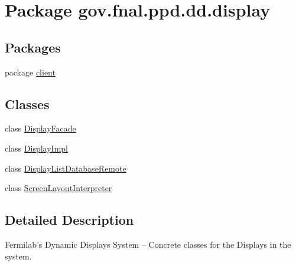 \hypertarget{namespacegov_1_1fnal_1_1ppd_1_1dd_1_1display}{\section{Package gov.\-fnal.\-ppd.\-dd.\-display}
\label{namespacegov_1_1fnal_1_1ppd_1_1dd_1_1display}
}
\subsection*{Packages}
\begin{DoxyCompactItemize}
\item 
package \hyperlink{namespacegov_1_1fnal_1_1ppd_1_1dd_1_1display_1_1client}{client}
\end{DoxyCompactItemize}
\subsection*{Classes}
\begin{DoxyCompactItemize}
\item 
class \hyperlink{classgov_1_1fnal_1_1ppd_1_1dd_1_1display_1_1DisplayFacade}{Display\-Facade}
\item 
class \hyperlink{classgov_1_1fnal_1_1ppd_1_1dd_1_1display_1_1DisplayImpl}{Display\-Impl}
\item 
class \hyperlink{classgov_1_1fnal_1_1ppd_1_1dd_1_1display_1_1DisplayListDatabaseRemote}{Display\-List\-Database\-Remote}
\item 
class \hyperlink{classgov_1_1fnal_1_1ppd_1_1dd_1_1display_1_1ScreenLayoutInterpreter}{Screen\-Layout\-Interpreter}
\end{DoxyCompactItemize}


\subsection{Detailed Description}
Fermilab's Dynamic Displays System -- Concrete classes for the Displays in the system.